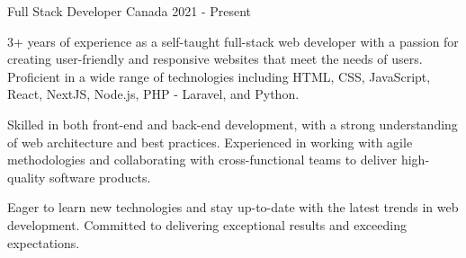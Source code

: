 

\begin{cventries}

  \cventry
    {Full Stack Developer} %
    {Canada} %
    {2021 - Present} %
    {
      \begin{cvitems} %
        \item {3+ years of experience as a self-taught full-stack web developer with a passion for creating user-friendly and responsive websites that meet the needs of users. Proficient in a wide range of technologies including HTML, CSS, JavaScript, React, NextJS, Node.js, PHP - Laravel, and Python.}
        \item {Skilled in both front-end and back-end development, with a strong understanding of web architecture and best practices. Experienced in working with agile methodologies and collaborating with cross-functional teams to deliver high-quality software products.}
        \item {Eager to learn new technologies and stay up-to-date with the latest trends in web development. Committed to delivering exceptional results and exceeding expectations.}
      \end{cvitems}
    }


\end{cventries}
